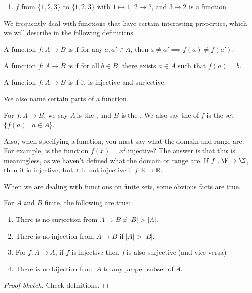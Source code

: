 \documentclass[a4paper]{scrartcl}
\begin{document}
\begin{example}
\begin{enumerate}[label=(\roman*)]
\begin{center}
\begin{tikzpicture}[x=0.75pt,y=0.75pt,yscale=-1,xscale=1]
\end{tikzpicture}

		\end{center}
		is a function.
	
	\item $f$ from $\{1, 2, 3\}$ to $\{1, 2, 3\}$ with $1 \mapsto 1$, $2 \mapsto 3$, and $3 \mapsto 2$ is a function.
\end{enumerate}
\end{example}

We frequently deal with functions that have certain interesting properties, which we will describe in the following definitions.

\begin{definition}[Injectivity]
	A function $f: A \rightarrow B$ is  if for any $a, a' \in A$, then $a \neq a' \implies f(a) \neq f(a')$.
\end{definition}
\begin{definition}[Surjectivity]
	A function $f : A \rightarrow B$ is  if for all $b \in B$, there exists $a \in A$ such that $f(a) = b$.
\end{definition}
\begin{definition}[Bijectivity]
	A function $f: A \rightarrow B$ is  if it is injective and surjective.
\end{definition}

We also name certain parts of a function.
\begin{definition}
	For $f: A \rightarrow B$, we say $A$ is the , and $B$ is the . We also say the  of $f$ is the set $\{f(a) \mid a \in A\}$.
\end{definition}
Also, when specifying a function, you must say what the domain and range are. For example, is the function $f(x) = x^2$ injective? The answer is that this is meaningless, as we haven't defined what the domain or range are. If $f : \N \rightarrow \N$, then it is injective, but it is not injective if $f: \mathbb{R} \rightarrow \mathbb{R}$.

When we are dealing with functions on finite sets, some obvious facts are true.
\begin{proposition}
	For $A$ and $B$ finite, the following are true:
	\begin{enumerate}[label=(\roman*)]
		\item There is no surjection from $A \rightarrow B$ if $|B| > |A|$.
		\item There is no injection from $A \rightarrow B$ if $|A| > |B|$.
		\item For $f: A \rightarrow A$, if $f$ is injective then $f$ is also surjective (and vice versa).
		\item There is no bijection from $A$ to any proper subset of $A$.
	\end{enumerate}
\end{proposition}
\begin{proof}[Proof Sketch]
	Check definitions.
\end{proof}
\end{document}
